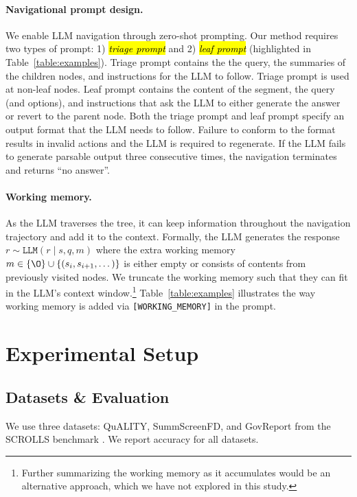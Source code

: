 \paragraph{Navigational prompt design.}

We enable LLM navigation through zero-shot 
prompting. 
Our method requires two types of prompt:
1) \textit{\hl{triage prompt}} and 2) \textit{\hl{leaf prompt}} (highlighted in Table~\ref{table:examples}).
Triage prompt contains the the query, the summaries of the children nodes, and instructions for the LLM to follow. Triage prompt is used at non-leaf nodes.
Leaf prompt contains the content of the segment, the query (and options), and instructions that ask the LLM to either generate the answer or revert to the parent node. Both the triage prompt and leaf prompt specify an output format that the LLM needs to follow. Failure to conform to the format results in invalid actions and the LLM is required to regenerate. If the LLM fails to generate parsable output three consecutive times, the navigation terminates and returns ``no answer''. 

\paragraph{Working memory.} As the LLM traverses the tree, it can keep information throughout the navigation trajectory and add it to the context. Formally, the LLM generates the response $r \sim \texttt{LLM}(r \mid s, q, m)$ where the extra working memory $m \in \{\O\} \cup \{ (s_i, s_{i+1}, \dots) \}$ is either empty or consists of contents from previously visited nodes. We truncate the working memory such that they can fit in the LLM's context window.\footnote{Further summarizing the working memory as it accumulates would be an alternative approach, which we have not explored in this study.} Table~\ref{table:examples} illustrates the way working memory is added via  \texttt{[WORKING\_MEMORY]} in the prompt.

\section{Experimental Setup}\label{sec:exp}

\subsection{Datasets \& Evaluation}
We use three datasets: QuALITY, SummScreenFD, and GovReport from the SCROLLS benchmark \citep{shaham2022scrolls}.
We report accuracy for all datasets.

